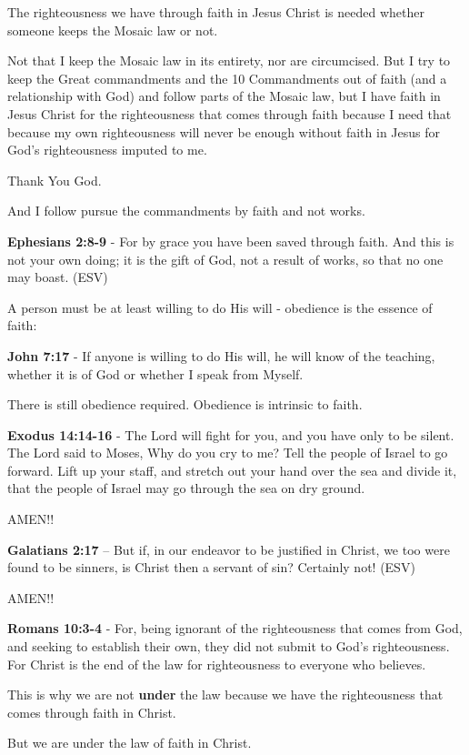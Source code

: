 \documentclass[11pt]{article}
\begin{document}
The righteousness we have through faith in Jesus Christ is needed whether someone keeps the Mosaic law or not.

Not that I keep the Mosaic law in its entirety, nor are circumcised. But I try to keep the Great commandments
and the 10 Commandments out of faith (and a relationship with God) and follow parts of the Mosaic law,
but I have faith in Jesus Christ for the righteousness that comes through faith because I need that because my own
righteousness will never be enough without faith in Jesus for God's righteousness imputed to me.

Thank You God.

And I follow pursue the commandments by faith and not works.

\textbf{Ephesians 2:8-9} - For by grace you have been saved through faith. And this is not your own doing; it is the gift of God, not a result of works, so that no one may boast. (ESV)

A person must be at least willing to do His will - obedience is the essence of faith:

\textbf{John 7:17} - If anyone is willing to do His will, he will know of the teaching, whether it is of God or whether I speak from Myself.

There is still obedience required. Obedience is intrinsic to faith.

\textbf{Exodus 14:14-16} - The Lord will fight for you, and you have only to be silent.  The Lord said to Moses, Why do you cry to me? Tell the people of Israel to go forward.  Lift up your staff, and stretch out your hand over the sea and divide it, that the people of Israel may go through the sea on dry ground.

AMEN!!

\textbf{Galatians 2:17} -- But if, in our endeavor to be justified in Christ, we too were found to be sinners, is Christ then a servant of sin? Certainly not! (ESV)

AMEN!!

\textbf{Romans 10:3-4} - For, being ignorant of the righteousness that comes from God, and seeking to establish their own, they did not submit to God's righteousness. For Christ is the end of the law for righteousness to everyone who believes.

This is why we are not \textbf{under} the law because we have the righteousness that comes through faith in Christ.

But we are under the law of faith in Christ.
\end{document}
